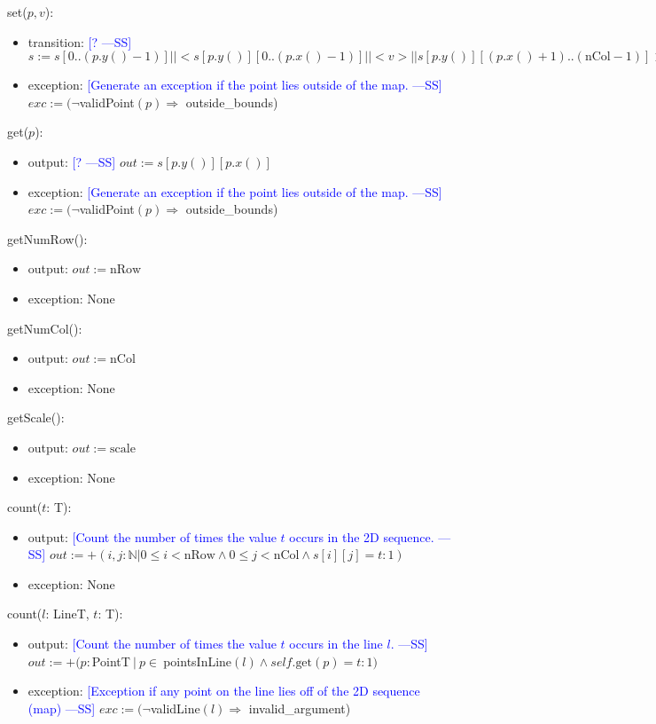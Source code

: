 \documentclass[12pt]{article}
\newcommand{\authornote}[3]{\textcolor{#1}{[#3 ---#2]}}
\newcommand{\authornote}[3]{}
\newcommand{\wss}[1]{\authornote{blue}{SS}{#1}}
\begin{document}
\noindent set($p, v$):
\begin{itemize}
\item transition: \wss{?} $s := s[0.. (p.y() -1)] || <s[p.y()][0.. (p.x() -1)] || <v> || s[p.y()][(p.x() +1).. (\mbox{nCol} - 1)]> || s[(p.y() +1).. (\mbox{nRow} - 1)]$
\item exception: \wss{Generate an exception if the point lies outside of the
    map.} $exc := (\lnot$validPoint$(p) \Rightarrow $ outside\_bounds)
\end{itemize}

\noindent get($p$):
\begin{itemize}
\item output: \wss{?} $out := s[p.y()][p.x()]$
\item exception: \wss{Generate an exception if the point lies outside of the
    map.} $exc := (\lnot$validPoint$(p) \Rightarrow $ outside\_bounds)
\end{itemize}

\noindent getNumRow():
\begin{itemize}
\item output: $out := \mbox{nRow}$
\item exception: None
\end{itemize}

\noindent getNumCol():
\begin{itemize}
\item output: $out := \mbox{nCol}$
\item exception: None
\end{itemize}

\noindent getScale():
\begin{itemize}
\item output: $out := \mbox{scale}$
\item exception: None
\end{itemize}

\noindent count($t$: T):
\begin{itemize}
\item output: \wss{Count the number of times the value $t$ occurs in the 2D
    sequence.} $out := +(i, j : \mathbb{N} | 0 \leq i < \mbox{nRow} \land 0 \leq j < \mbox{nCol} \land s[i][j] = t : 1)$ 
\item exception: None
\end{itemize}

\noindent count($l$: LineT, $t$: T):
\begin{itemize}
\item output: \wss{Count the number of times the value $t$ occurs in the line
    $l$.} $out := +(p : $PointT$ \ | \ p \in \ $pointsInLine$(l) \land self.\mbox{get}(p) = t : 1)$ 
\item exception:  \wss{Exception if any point on the line lies off of the 2D
    sequence (map)} $exc := (\lnot$validLine$(l) \Rightarrow $ invalid\_argument)
\end{itemize}
\end{document}
